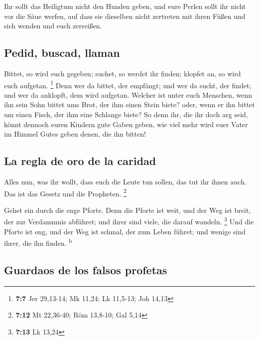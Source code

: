  Ihr sollt das Heiligtum nicht den Hunden geben, und eure
Perlen sollt ihr nicht vor die Säue werfen, auf dass sie dieselben nicht
zertreten mit ihren Füßen und sich wenden und euch zerreißen.

\hypertarget{pedid-buscad-llaman}{%
\subsection{Pedid, buscad, llaman}\label{pedid-buscad-llaman}}

 Bittet, so wird euch gegeben; suchet, so werdet ihr
finden; klopfet an, so wird euch aufgetan. \footnote{\textbf{7:7} Jer
  29,13-14; Mk 11,24; Lk 11,5-13; Joh 14,13}  Denn wer da
bittet, der empfängt; und wer da sucht, der findet; und wer da anklopft,
dem wird aufgetan.  Welcher ist unter euch Menschen, wenn
ihn sein Sohn bittet ums Brot, der ihm einen Stein biete?
 oder, wenn er ihn bittet um einen Fisch, der ihm eine
Schlange biete?  So denn ihr, die ihr doch arg seid,
könnt dennoch euren Kindern gute Gaben geben, wie viel mehr wird euer
Vater im Himmel Gutes geben denen, die ihn bitten!

\hypertarget{la-regla-de-oro-de-la-caridad}{%
\subsection{La regla de oro de la
caridad}\label{la-regla-de-oro-de-la-caridad}}

 Alles nun, was ihr wollt, dass euch die Leute tun
sollen, das tut ihr ihnen auch. Das ist das Gesetz und die Propheten.
\footnote{\textbf{7:12} Mt 22,36-40; Röm 13,8-10; Gal 5,14}

 Gehet ein durch die enge Pforte. Denn die Pforte ist
weit, und der Weg ist breit, der zur Verdammnis abführet; und ihrer sind
viele, die darauf wandeln. \footnote{\textbf{7:13} Lk 13,24}
 Und die Pforte ist eng, und der Weg ist schmal, der zum
Leben führet; und wenige sind ihrer, die ihn finden. \textsuperscript{b}

\hypertarget{guardaos-de-los-falsos-profetas}{%
\subsection{Guardaos de los falsos
profetas}\label{guardaos-de-los-falsos-profetas}}

